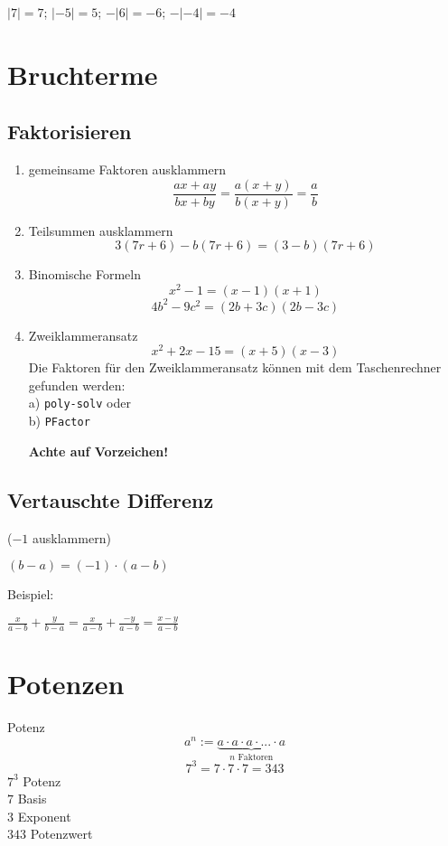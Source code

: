 \begin{multicols}{2}
$|7| = 7$;  \hfill{ } $|-5| = 5$; \hfill{} $-|6|=-6$; \hfill{} $-|-4| = -4$

\TRAINER{Intervall-Schreibweise? \zB $a\in[0;1[$}

\forceCB

\section*{Bruchterme}
\subsection*{Faktorisieren}


\begin{rezept*}{}{}
\begin{enumerate}
\item gemeinsame Faktoren ausklammern
$$\frac{ax+ay}{bx+by} =\frac{a(x+y)}{b(x+y)} = \frac{a}b$$
\item Teilsummen ausklammern
$$3(7r+6) - b(7r+6) = (3-b)(7r+6)$$
\item Binomische Formeln
$$x^2-1 = (x-1)(x+1)$$
$$4b^2-9c^2=(2b+3c)(2b-3c)$$
\item Zweiklammeransatz
$$x^2+2x-15 = (x+5)(x-3)$$
Die Faktoren für den Zweiklammeransatz können mit dem Taschenrechner
gefunden werden:\\ a) \texttt{poly-solv} 
oder\\ b) \texttt{PFactor} 

\textbf{\color{red}Achte auf Vorzeichen!}
\end{enumerate}
\end{rezept*}

\subsection*{Vertauschte Differenz}
($-1$ ausklammern)

$(b-a)=(-1)\cdot{}(a-b)$

Beispiel:

$\frac{x}{a-b} +  \frac{y}{b-a} = \frac{x}{a-b} + \frac{-y}{a-b} = \frac{x-y}{a-b}$



\section*{Potenzen}
\begin{definition*}{Potenz}{}
$$a^n := \underbrace{a\cdot{}a\cdot{}a\cdot{}...\cdot{}a}_{n\textrm{ Faktoren}}$$
$$7^3=7\cdot{}7\cdot{}7=343$$
$7^3$ Potenz\\
$7$ Basis\\
$3$ Exponent\\
$343$ Potenzwert\\
\end{definition*}


\end{multicols}
